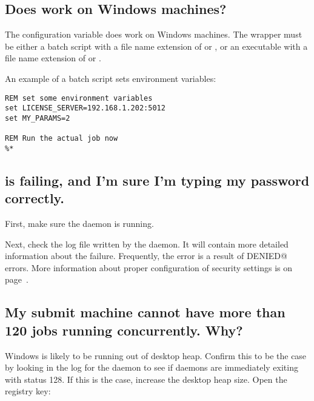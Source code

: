 \subsection*{Does  work on Windows machines?}
The  configuration variable
does work on Windows machines.
The wrapper must be either a
batch script with a file name extension of  or ,
or an
executable with a file name extension of  or .

An example of a batch script sets environment variables:
\footnotesize
\begin{verbatim}
REM set some environment variables
set LICENSE_SERVER=192.168.1.202:5012
set MY_PARAMS=2

REM Run the actual job now
%*
\end{verbatim}
\normalsize


\subsection*{ is failing, and I'm sure I'm typing my password correctly.}

First, make sure the  daemon is running.

Next, check the log file written by the  daemon.
It will contain more detailed information about the failure.
Frequently, the error is a result of 
\verb@PERMISSION DENIED@ errors.
More information about proper configuration of 
security settings is on page~\pageref{sec:Host-Security}.


\subsection*{My submit machine cannot have more than 120 jobs running concurrently. Why?}

Windows is likely to be running out of desktop heap. 
Confirm this to be the case
by looking in the log for the  daemon
to see if  daemons are immediately
exiting with status 128.
If this is the case, increase the desktop heap size.
Open the registry key:

